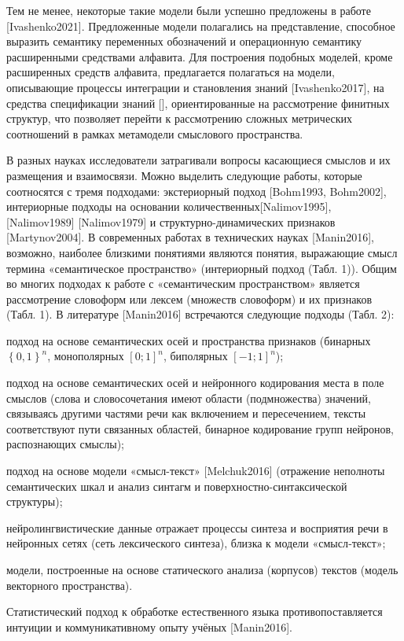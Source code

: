 Тем не менее, некоторые такие модели были успешно предложены в работе [Ivashenko2021]. Предложенные модели полагались на представление, способное выразить семантику переменных обозначений и операционную семантику расширенными средствами алфавита. Для построения подобных моделей, кроме расширенных средств алфавита, предлагается полагаться на модели, описывающие процессы интеграции и становления знаний [Ivashenko2017], на средства спецификации знаний [], ориентированные на рассмотрение финитных структур, что позволяет перейти к рассмотрению сложных метрических соотношений в рамках метамодели смыслового пространства.

В разных науках исследователи затрагивали вопросы касающиеся смыслов и их размещения и взаимосвязи. Можно выделить следующие работы, которые соотносятся с тремя подходами: экстериорный подход [Bohm1993, Bohm2002], интериорные подходы на основании количественных[Nalimov1995], [Nalimov1989] [Nalimov1979] и структурно-динамических признаков [Martynov2004].
В современных работах в технических науках [Manin2016], возможно, наиболее близкими понятиями являются понятия, выражающие смысл термина «семантическое пространство» (интериорный подход (Табл. 1)).
Общим во многих подходах к работе с «семантическим пространством» является рассмотрение словоформ или лексем (множеств словоформ) и их признаков (Табл. 1). В литературе [Manin2016] встречаются следующие подходы (Табл. 2):
\begin{textitemize}
	\item подход на основе семантических осей и пространства признаков (бинарных $\left\lbrace 0,1\right\rbrace ^{n}$, монополярных $\left[0;1\right]^{n}$, биполярных $\left[-1;1\right]^{n}$);
	\item подход на основе семантических осей и нейронного кодирования места в поле смыслов (слова и словосочетания имеют области (подмножества) значений, связываясь другими частями речи как включением и пересечением, тексты соответствуют пути связанных областей, бинарное кодирование групп нейронов, распознающих смыслы);
	\item подход на основе модели «смысл-текст» [Melchuk2016] (отражение неполноты семантических шкал и анализ синтагм и поверхностно-синтаксической структуры);
	\item нейролингвистические данные отражает процессы синтеза и восприятия речи в нейронных сетях (сеть лексического синтеза), близка к модели «смысл‑текст»;
	\item модели, построенные на основе статического анализа (корпусов) текстов (модель векторного пространства).
\end{textitemize}
Статистический подход к обработке естественного языка противопоставляется интуиции и коммуникативному опыту учёных [Manin2016].

